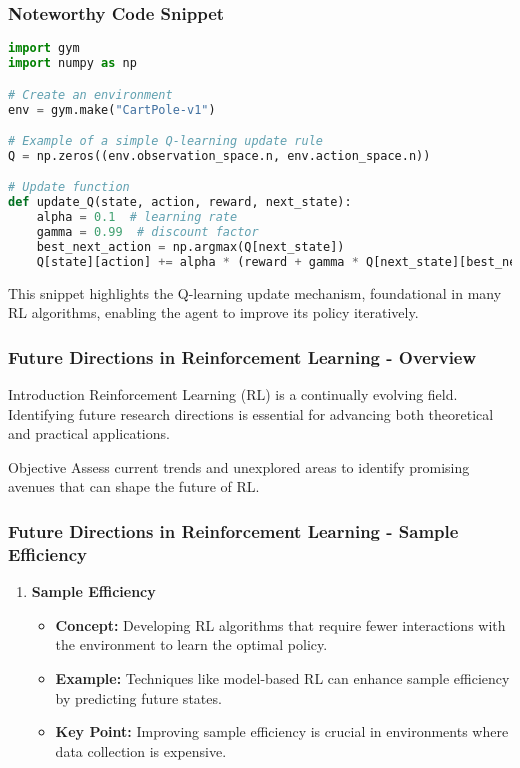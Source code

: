 \documentclass[aspectratio=169]{beamer}
\begin{document}
\begin{frame}[fragile]
  \frametitle{Noteworthy Code Snippet}
  \begin{lstlisting}[language=Python]
import gym
import numpy as np

# Create an environment
env = gym.make("CartPole-v1")

# Example of a simple Q-learning update rule
Q = np.zeros((env.observation_space.n, env.action_space.n))

# Update function
def update_Q(state, action, reward, next_state):
    alpha = 0.1  # learning rate
    gamma = 0.99  # discount factor
    best_next_action = np.argmax(Q[next_state])
    Q[state][action] += alpha * (reward + gamma * Q[next_state][best_next_action] - Q[state][action])
  \end{lstlisting}
  
  This snippet highlights the Q-learning update mechanism, foundational in many RL algorithms, enabling the agent to improve its policy iteratively.
\end{frame}

\begin{frame}
    \frametitle{Future Directions in Reinforcement Learning - Overview}
    \begin{block}{Introduction}
        Reinforcement Learning (RL) is a continually evolving field. Identifying future research directions is essential for advancing both theoretical and practical applications.
    \end{block}
    \begin{block}{Objective}
        Assess current trends and unexplored areas to identify promising avenues that can shape the future of RL.
    \end{block}
\end{frame}

\begin{frame}
    \frametitle{Future Directions in Reinforcement Learning - Sample Efficiency}
    \begin{enumerate}
        \item \textbf{Sample Efficiency}
            \begin{itemize}
                \item \textbf{Concept:} Developing RL algorithms that require fewer interactions with the environment to learn the optimal policy.
                \item \textbf{Example:} Techniques like model-based RL can enhance sample efficiency by predicting future states.
                \item \textbf{Key Point:} Improving sample efficiency is crucial in environments where data collection is expensive.
            \end{itemize}
    \end{enumerate}
\end{frame}
\end{document}
